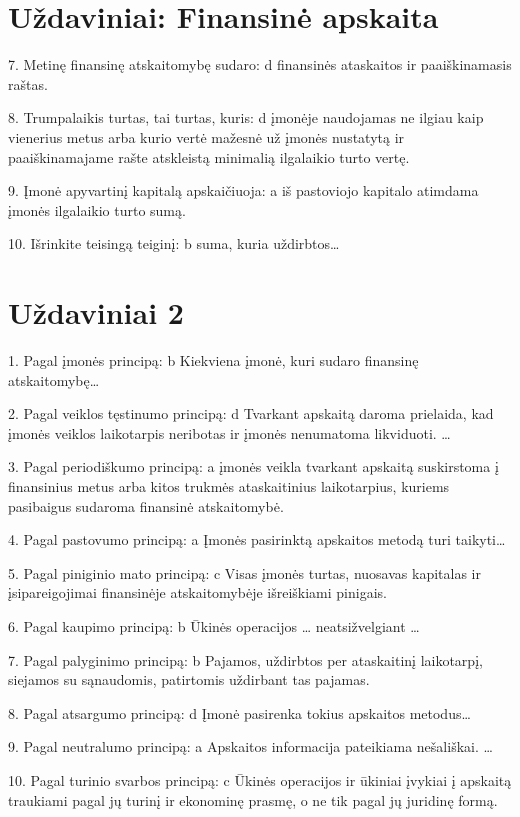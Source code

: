 

\chapter{Uždaviniai: Finansinė apskaita}


7. Metinę finansinę atskaitomybę sudaro: d finansinės ataskaitos
ir paaiškinamasis raštas.

8. Trumpalaikis turtas, tai turtas, kuris: d įmonėje naudojamas
ne ilgiau kaip vienerius metus arba kurio vertė mažesnė už
įmonės nustatytą ir paaiškinamajame rašte atskleistą minimalią
ilgalaikio turto vertę.

9. Įmonė apyvartinį kapitalą apskaičiuoja: a iš pastoviojo kapitalo
atimdama įmonės ilgalaikio turto sumą.

10. Išrinkite teisingą teiginį: b suma, kuria uždirbtos…

\chapter{Uždaviniai 2}

1. Pagal įmonės principą:
b Kiekviena įmonė, kuri sudaro  finansinę atskaitomybę…

2. Pagal veiklos tęstinumo principą:
d Tvarkant apskaitą daroma prielaida, kad įmonės veiklos laikotarpis
neribotas ir įmonės nenumatoma likviduoti. …

3. Pagal periodiškumo principą:
a įmonės veikla tvarkant apskaitą suskirstoma į finansinius metus
arba kitos trukmės ataskaitinius laikotarpius, kuriems pasibaigus
sudaroma finansinė atskaitomybė.

4. Pagal pastovumo principą:
a Įmonės pasirinktą apskaitos metodą turi taikyti…

5. Pagal piniginio mato principą:
c Visas įmonės turtas, nuosavas kapitalas ir įsipareigojimai
finansinėje atskaitomybėje išreiškiami pinigais.

6. Pagal kaupimo principą:
b Ūkinės operacijos … neatsižvelgiant …

7. Pagal palyginimo principą:
b Pajamos, uždirbtos per ataskaitinį laikotarpį, siejamos su
sąnaudomis, patirtomis uždirbant tas pajamas.

8. Pagal atsargumo principą:
d Įmonė pasirenka tokius apskaitos metodus…

9. Pagal neutralumo principą:
a Apskaitos informacija pateikiama nešališkai. …

10. Pagal turinio svarbos principą:
c Ūkinės operacijos ir ūkiniai įvykiai į apskaitą traukiami pagal jų
turinį ir ekonominę prasmę, o ne tik pagal jų juridinę formą.

